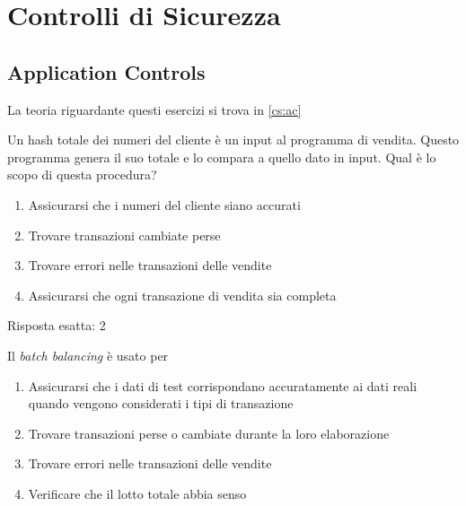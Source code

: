 \section{Controlli di Sicurezza}
\label{esCs}

\subsection{Application Controls}
\label{esCs:ac}

La teoria riguardante questi esercizi si trova in \ref{cs:ac}


\begin{Exercise} [
  title={Quiz},
  label={esCs1}
  ]

  \Question Un hash totale dei numeri del cliente \`e un input al programma di
vendita. Questo programma genera il suo totale e lo compara a quello dato in
input. Qual \`e lo scopo di questa procedura?
\begin{enumerate}
 \item Assicurarsi che i numeri del cliente siano accurati
 \item Trovare transazioni cambiate perse
 \item Trovare errori nelle transazioni delle vendite
 \item Assicurarsi che ogni transazione di vendita sia completa
\end{enumerate}

\end{Exercise}

\begin{Answer} [
  ref={esCs1},
  number={1}
  ]

  \Question Risposta esatta: 2
\end{Answer}


\begin{Exercise} [
  title={Quiz},
  label={esCs2}
  ]

  \Question Il \textit{batch balancing} \`e usato per
  \begin{enumerate}
   \item Assicurarsi che i dati di test corrispondano accuratamente ai dati
reali quando vengono considerati i tipi di transazione
   \item Trovare transazioni perse o cambiate durante la loro elaborazione
   \item Trovare errori nelle transazioni delle vendite
   \item Verificare che il lotto totale abbia senso
  \end{enumerate}
\end{Exercise}

